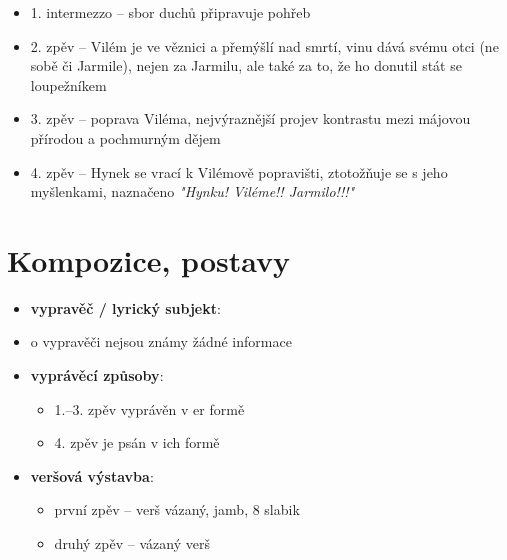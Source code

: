 \documentclass[10pt,a4paper]{article}
\begin{document}
\begin{itemize}
\begin{itemize}
\begin{itemize}
		\item 1. intermezzo -- sbor duchů připravuje pohřeb
		\item 2. zpěv -- Vilém je ve věznici a přemýšlí nad smrtí, vinu dává svému otci (ne sobě či Jarmile), nejen za Jarmilu, ale také za to, že ho donutil stát se loupežníkem
		\item 3. zpěv -- poprava Viléma, nejvýraznější projev kontrastu mezi májovou přírodou a pochmurným dějem
		\item 4. zpěv -- Hynek se vrací k Vilémově popravišti, ztotožňuje se s jeho myšlenkami, naznačeno \textit{"Hynku! Viléme!! Jarmilo!!!"}
		\end{itemize}
	\end{itemize}
\end{itemize}
\section*{Kompozice, postavy}
\begin{itemize}
\item \textbf{vypravěč / lyrický subjekt}: 
	\item o vypravěči nejsou známy žádné informace
\item \textbf{vyprávěcí způsoby}:
	\begin{itemize}
	\item 1.--3. zpěv vyprávěn v er formě
	\item 4. zpěv je psán v ich formě
	\end{itemize}
\item \textbf{veršová výstavba}:	
	\begin{itemize}
	\item první zpěv -- verš vázaný, jamb, 8 slabik
	\item druhý zpěv -- vázaný verš
	\end{itemize}
\end{itemize}
\end{document}
